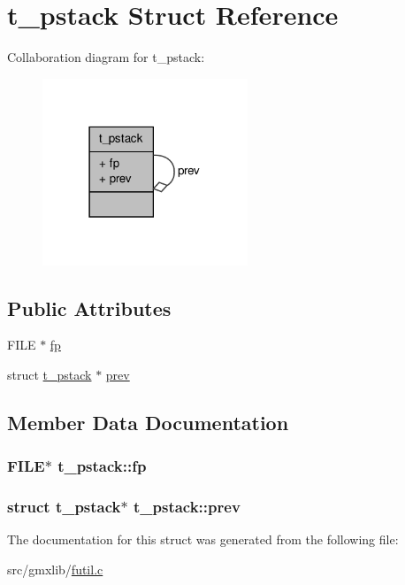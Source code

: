 \hypertarget{structt__pstack}{\section{t\-\_\-pstack \-Struct \-Reference}
\label{structt__pstack}
}


\-Collaboration diagram for t\-\_\-pstack\-:
\nopagebreak
\begin{figure}[H]
\begin{center}
\leavevmode
\includegraphics[width=174pt]{structt__pstack__coll__graph}
\end{center}
\end{figure}
\subsection*{\-Public \-Attributes}
\begin{DoxyCompactItemize}
\item 
\-F\-I\-L\-E $\ast$ \hyperlink{structt__pstack_a19c31f8c5029fa710632c3c1bd1a3087}{fp}
\item 
struct \hyperlink{structt__pstack}{t\-\_\-pstack} $\ast$ \hyperlink{structt__pstack_aab118d734ca2bf97fd1eb2ebb65e461c}{prev}
\end{DoxyCompactItemize}


\subsection{\-Member \-Data \-Documentation}
\hypertarget{structt__pstack_a19c31f8c5029fa710632c3c1bd1a3087}{
\subsubsection[{fp}]{\setlength{\rightskip}{0pt plus 5cm}\-F\-I\-L\-E$\ast$ {\bf t\-\_\-pstack\-::fp}}}\label{structt__pstack_a19c31f8c5029fa710632c3c1bd1a3087}
\hypertarget{structt__pstack_aab118d734ca2bf97fd1eb2ebb65e461c}{
\subsubsection[{prev}]{\setlength{\rightskip}{0pt plus 5cm}struct {\bf t\-\_\-pstack}$\ast$ {\bf t\-\_\-pstack\-::prev}}}\label{structt__pstack_aab118d734ca2bf97fd1eb2ebb65e461c}


\-The documentation for this struct was generated from the following file\-:\begin{DoxyCompactItemize}
\item 
src/gmxlib/\hyperlink{futil_8c}{futil.\-c}\end{DoxyCompactItemize}
